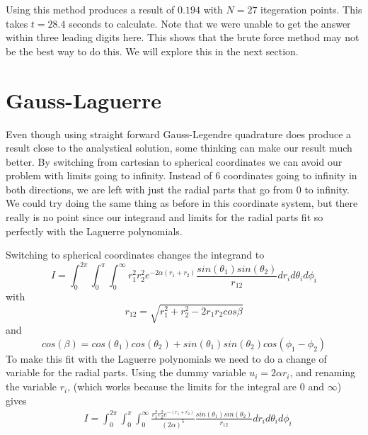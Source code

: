 \documentclass{aa}   %
\begin{document}
Using this method produces a result of $0.194$ with $N = 27$ itegeration points. This takes $t = 28.4$ seconds to calculate. Note that we were unable to get the answer within three leading digits here. This shows that the brute force method may not be the best way to do this. We will explore this in the next section.

\section{Gauss-Laguerre}\label{sec:Gauss-Laguerre}
Even though using straight forward Gauss-Legendre quadrature does produce a result close to the analystical solution, some thinking can make our result much better. By switching from cartesian to spherical coordinates we can avoid our problem with limits going to infinity. Instead of 6 coordinates going to infinity in both directions, we are left with just the radial parts that go from 0 to infinity. We could try doing the same thing as before in this coordinate system, but there really is no point since our integrand and limits for the radial parts fit so perfectly with the Laguerre polynomials. 

Switching to spherical coordinates changes the integrand to 
\begin{equation}
 I = \int_0^{2\pi}\int_0^{\pi}\int_0^{\infty}r_1^2r_2^2e^{-2\alpha(r_1+r_2)} \frac{sin(\theta_1)sin(\theta_2)}{r_{12}} dr_i d\theta_i d\phi_i
\end{equation}
with 
\begin{equation}
 r_{12} = \sqrt{r_1^2 + r_2^2 -2r_1 r_2cos\beta}
\end{equation}
and
\begin{equation}
 cos(\beta) = cos(\theta_1)cos(\theta_2) + sin(\theta_1)sin(\theta_2)cos(\phi_1 - \phi_2)
\end{equation}
To make this fit with the Laguerre polynomials we need to do a change of variable for the radial parts.
Using the dummy variable $u_i = 2\alpha r_i$, and renaming the variable $r_i$, (which works because the limits for the integral are $0$ and $\infty$) gives
\begin{equation}
\begin{aligned}
&I = \int_0^{2\pi}\int_0^{\pi}\int_0^{\infty}\frac{r_1^2r_2^2e^{-(r_1+r_2)}}{(2\alpha)^5} \frac{sin(\theta_1)sin(\theta_2)}{r_{12}} dr_i d\theta_i d\phi_i
\end{aligned}
\end{equation}
\end{document}
